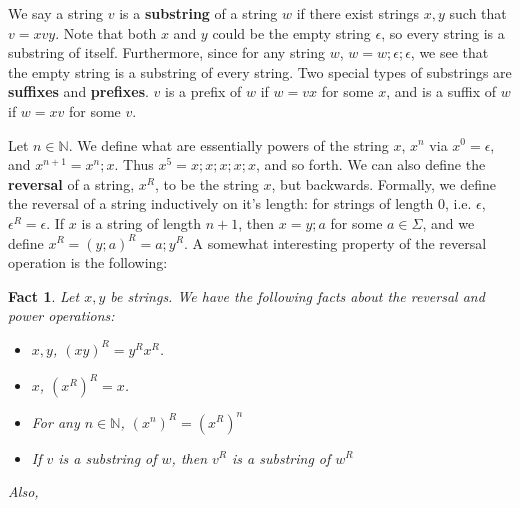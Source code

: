 \documentclass{article}
\theoremstyle{definition}
\theoremstyle{plain}
\theoremstyle{theorem}
\newtheorem{fact}{Fact}[section]
\begin{document}
We say a string $v$ is a \textbf{substring} of a string $w$ if there exist strings $x,y$ such that $v = xvy$. Note that both $x$ and $y$ could be the empty string $\epsilon$, so every string is a substring of itself. Furthermore, since for any string $w$, $w = w;\epsilon;\epsilon$, we see that the empty string is a substring of every string. Two special types of substrings are \textbf{suffixes} and \textbf{prefixes}. $v$ is a prefix of $w$ if $w = vx$ for some $x$, and is a suffix of $w$ if $w = xv$ for some $v$. 
\par Let $n \in \mathbb{N}$. We define what are essentially powers of the string $x$, $x^n$ via $x^0=\epsilon$, and $x^{n+1} = x^n;x$. Thus $x^5 = x;x;x;x;x$, and so forth. We can also define the \textbf{reversal} of a string, $x^R$, to be the string $x$, but backwards. Formally, we define the reversal of a string inductively on it's length: for strings of length $0$, i.e. $\epsilon$, $\epsilon^R = \epsilon$. If $x$ is a string of length $n+1$, then $x = y;a$ for some $a \in \Sigma$, and we define $x^R = (y;a)^R = a;y^R$. A somewhat interesting property of the reversal operation is the following:
\begin{fact}
	Let $x,y$ be strings. We have the following facts about the reversal and power operations:
	\begin{itemize}
	\item[(a)] $x,y$, $(xy)^R = y^Rx^R$.
	\item[(b)] $x$, $(x^R)^R = x$.
	\item[(c)] For any $n \in \mathbb{N}$, $(x^n)^R = (x^R)^n$
	\item[(d)] If $v$ is a substring of $w$, then $v^R$ is a substring of $w^R$
	\end{itemize}
	 Also, 
\end{fact}
\end{document}
